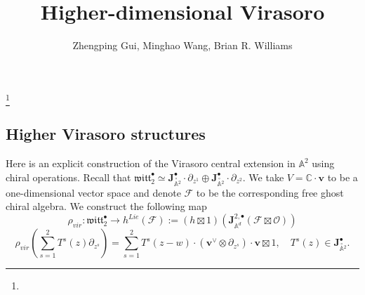 \documentclass[11pt]{amsart}
\theoremstyle{definition}
\theoremstyle{remark}
\numberwithin{equation}{section}
\begin{document}
\title[]{Higher-dimensional Virasoro}%
\author{Zhengping Gui, Minghao Wang, Brian R. Williams}%
\address{}%
\email{}%

\thanks{}%
\subjclass{}%
\keywords{}%


\maketitle
\setcounter{tocdepth}{1}
\tableofcontents

\subsection{Higher Virasoro structures}


Here is an explicit construction of the Virasoro central extension in $\mathbb{A}^2$ using chiral operations. Recall that $\mathfrak{witt}^{\bullet}_{2}\simeq \mathbf{J}^{\bullet}_{\overset{\circ}{\mathbb{A}} {}^2}\cdot \partial_{z^1}\oplus\mathbf{J}^{\bullet}_{\overset{\circ}{\mathbb{A}} {}^2}\cdot \partial_{z^2}$. We take $V=\mathbb{C}\cdot \mathbf{v}$ to be a one-dimensional vector space and denote $\mathcal{F}$ to be the corresponding free ghost chiral algebra. We construct the following map
$$
\rho_{vir}:\mathfrak{witt}^{\bullet}_{2}\rightarrow h^{Lie}(\mathcal{F}):=(h\boxtimes 1)\left(\mathbf{J}^{2,\bullet}_{\mathbb{A}^d}(\mathcal{F}\boxtimes \mathcal{O})\right)
$$
$$
\rho_{vir}(\sum^2_{s=1}T^s(z)\partial_{z^s})=\sum^2_{s=1}T^s(z-w)\cdot(\mathbf{v}^{\vee}\otimes \partial_{z^s})\cdot \mathbf{v}\boxtimes 1,\quad T^s(z)\in \mathbf{J}^{\bullet}_{\overset{\circ}{\mathbb{A}} {}^2}.
$$
\end{document}
